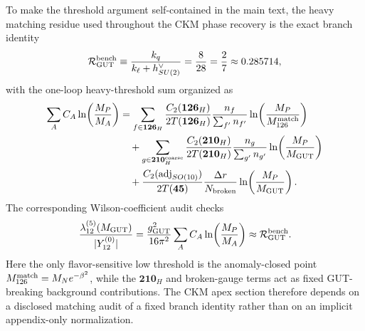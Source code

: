 \documentclass[11pt]{article}
\begin{document}
To make the threshold argument self-contained in the main text, the heavy
matching residue used throughout the CKM phase recovery is the exact branch
identity
\begin{equation}
 \mathcal R_{\rm GUT}^{\rm bench}
 \equiv
 \frac{k_q}{k_{\ell}+h^{\vee}_{SU(2)}}
 =
 \frac{8}{28}
 =
 \frac{2}{7}
 \approx
 0.285714,
\end{equation}
with the one-loop heavy-threshold sum organized as
\begin{align}
 \sum_A C_A\ln\!\left(\frac{M_P}{M_A}\right)
 &=
 \sum_{f\in\mathbf{126}_H}
 \frac{C_2(\mathbf{126}_H)}{2T(\mathbf{126}_H)}
 \frac{n_f}{\sum_{f'}n_{f'}}
 \ln\!\left(\frac{M_P}{M_{126}^{\rm match}}\right)
 \notag\\
 &\quad+
 \sum_{g\in\mathbf{210}_H^{\rm coarse}}
 \frac{C_2(\mathbf{210}_H)}{2T(\mathbf{210}_H)}
 \frac{n_g}{\sum_{g'}n_{g'}}
 \ln\!\left(\frac{M_P}{M_{\rm GUT}}\right)
 \notag\\
 &\quad+
 \frac{C_2({\rm adj}_{SO(10)})}{2T(\mathbf{45})}
 \frac{\Delta r}{N_{\rm broken}}
 \ln\!\left(\frac{M_P}{M_{\rm GUT}}\right).
\end{align}
The corresponding Wilson-coefficient audit checks
\begin{equation}
 \frac{\lambda_{12}^{(5)}(M_{\rm GUT})}{|Y_{12}^{(0)}|}
 =
 \frac{g_{\rm GUT}^2}{16\pi^2}
 \sum_A C_A\ln\!\left(\frac{M_P}{M_A}\right)
 \approx
 \mathcal R_{\rm GUT}^{\rm bench}.
\end{equation}
Here the only flavor-sensitive low threshold is the anomaly-closed point
$M_{126}^{\rm match}=M_N e^{-\beta^2}$, while the $\mathbf{210}_H$ and broken-gauge
terms act as fixed GUT-breaking background contributions. The CKM apex section
therefore depends on a disclosed matching audit of a fixed branch identity rather than on an implicit
appendix-only normalization.
\end{document}
